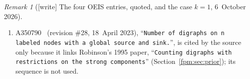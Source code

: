 \documentclass[11pt]{article}
\theoremstyle{definition}\newtheorem{definition}[theorem]{Definition}
\theoremstyle{remark}\newtheorem{remark}[theorem]{Remark}
\begin{document}
\begin{remark}[{[write]} The four OEIS entries, quoted, and the case $k=1$, 6~October 2026]
\begin{enumerate}[label=(\alph*)]
 $I+A_{\pi(D)}=P_\pi(I+A_D)P_\pi^{-1}$; so their number is the number of
 unlabelled acyclic digraphs, OEIS A003087~\cite{oeisunl} ($1,2,6,31$ for
 $n=1,\dots,4$, as an exhaustive enumeration confirms). \textup{(Added after
 the independent check of 6~October 2026.)} This is
 recorded here only; nothing was submitted to the OEIS.
\item A350790~\cite{robinson} (revision \#28, 18~April 2023), ``\texttt{Number
 of digraphs on n labeled nodes with a global source and sink.}'', is cited
 by the source only because it links Robinson's 1995 paper, ``\texttt{Counting
 digraphs with restrictions on the strong components}''
 (Section~\ref{fpm:sec:prior}); its sequence is not used.
\end{enumerate}
\end{remark}
\end{document}
